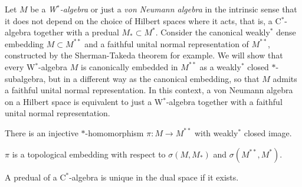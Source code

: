 \documentclass{../../large}
\begin{document}
\begin{prb}
Let $M$ be a \emph{W$^*$-algebra} or just a \emph{von Neumann algebra} in the intrinsic sense that it does not depend on the choice of Hilbert spaces where it acts, that is, a C$^*$-algebra together with a predual $M_*\subset M^*$.
Consider the canonical weakly$^*$ dense embedding $M\subset M^{**}$ and a faithful unital normal representation of $M^{**}$, constructed by the Sherman-Takeda theorem for example.
We will show that every W$^*$-algebra $M$ is canonically embedded in $M^{**}$ as a weakly$^*$ closed $*$-subalgebra, but in a different way as the canonical embedding, so that $M$ admits a faithful unital normal representation.
In this context, a von Neumann algebra on a Hilbert space is equivalent to just a W$^*$-algebra together with a faithful unital normal representation.
\begin{parts}
\item There is an injective $*$-homomorphism $\pi:M\to M^{**}$ with weakly$^*$ closed image.
\item $\pi$ is a topological embedding with respect to $\sigma(M,M_*)$ and $\sigma(M^{**},M^*)$.
\item A predual of a C$^*$-algebra is unique in the dual space if it exists.
\end{parts}
\end{prb}
\end{document}
